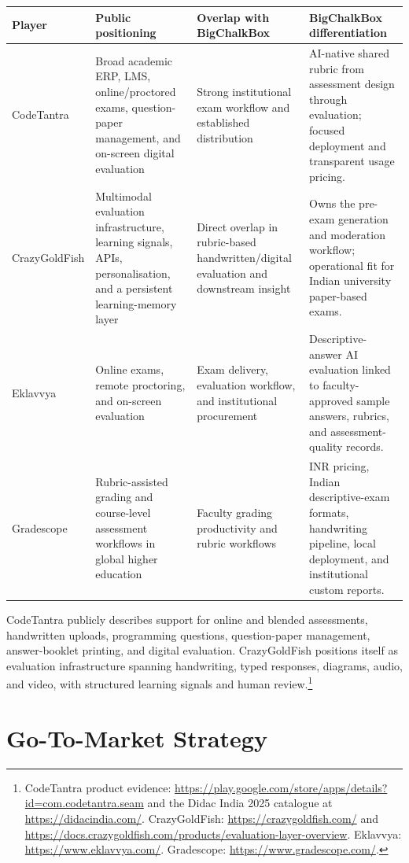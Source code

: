\documentclass[11pt,a4paper]{article}
\begin{document}
\begin{tabularx}{\textwidth}{L{0.16\textwidth}L{0.25\textwidth}L{0.26\textwidth}Y}
\toprule
\textbf{Player} & \textbf{Public positioning} & \textbf{Overlap with BigChalkBox} & \textbf{BigChalkBox differentiation} \\
\midrule
CodeTantra & Broad academic ERP, LMS, online/proctored exams, question-paper management, and on-screen digital evaluation & Strong institutional exam workflow and established distribution & AI-native shared rubric from assessment design through evaluation; focused deployment and transparent usage pricing. \\
CrazyGoldFish & Multimodal evaluation infrastructure, learning signals, APIs, personalisation, and a persistent learning-memory layer & Direct overlap in rubric-based handwritten/digital evaluation and downstream insight & Owns the pre-exam generation and moderation workflow; operational fit for Indian university paper-based exams. \\
Eklavvya & Online exams, remote proctoring, and on-screen evaluation & Exam delivery, evaluation workflow, and institutional procurement & Descriptive-answer AI evaluation linked to faculty-approved sample answers, rubrics, and assessment-quality records. \\
Gradescope & Rubric-assisted grading and course-level assessment workflows in global higher education & Faculty grading productivity and rubric workflows & INR pricing, Indian descriptive-exam formats, handwriting pipeline, local deployment, and institutional custom reports. \\
\bottomrule
\end{tabularx}

CodeTantra publicly describes support for online and blended assessments, handwritten uploads, programming questions, question-paper management, answer-booklet printing, and digital evaluation. CrazyGoldFish positions itself as evaluation infrastructure spanning handwriting, typed responses, diagrams, audio, and video, with structured learning signals and human review.\footnote{CodeTantra product evidence: \url{https://play.google.com/store/apps/details?id=com.codetantra.seam} and the Didac India 2025 catalogue at \url{https://didacindia.com/}. CrazyGoldFish: \url{https://crazygoldfish.com/} and \url{https://docs.crazygoldfish.com/products/evaluation-layer-overview}. Eklavvya: \url{https://www.eklavvya.com/}. Gradescope: \url{https://www.gradescope.com/}.}

\section{Go-To-Market Strategy}
\end{document}
